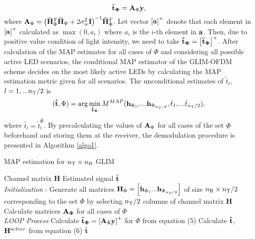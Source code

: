 \documentclass[12pt,letterpaper]{IEEEtran}
\begin{document}
\begin{equation}
{\bf{\bar t}_\Phi} = {{\bf{A}}_\Phi }{\bf{y}},
\label{equa:find t}
\end{equation}
where ${{\bf{A}}_\Phi } = {\left( {{\bf{\bar H}}_\Phi ^T{{{\bf{\bar H}}}_\Phi } + 2\sigma _w^2{\bf{I}}} \right)^{ - 1}}{\bf{\bar H}}_\Phi ^T$. Let vector ${\left[ {\bf{a}} \right]^ + }$ denote that each element in ${\left[ {\bf{a}} \right]^ + }$ calculated as $\max \left( {0,{a_i}} \right)$ where $a_i$ is the $i{\text{-th}}$ element in $\bf{a}$. Then, due to positive value condition of light intensity, we need to take ${{\bf{\tilde t}_\Phi}} = {\left[ {{{{\bf{\bar t}_\Phi}}}} \right]^ + }$. After calculation of the MAP estimates for all cases of $\Phi$ and considering all possible active LED scenarios, the conditional MAP estimator of the GLIM-OFDM scheme decides on the most likely active LEDs by calculating the MAP estimation metric given for all scenarios. The unconditional estimates of ${{\tilde t}_{l}}$, $l = 1,...{n_{\text T}}/2$ is 
\begin{equation}
({\bf{\hat t}},\Phi)  = \arg \mathop {\min }\limits_{{{{\bf{\tilde t}}}_{\bf{\Phi }}}} {M^{MAP}}({{\bf{h}}_{{\Phi _1}}},...{{\bf{h}}_{{\Phi _{{n_{\text{T}}}/2}}}},{\tilde t_1},...{\tilde t_{{n_{\text{T}}}/2}}),
\end{equation}
where ${\hat t_l} = \tilde t_l^{\hat{\Phi}}$. By precalculating the values of ${{\bf{A}}_\Phi}$ for all cases of the set $\Phi$ beforehand and storing them at the receiver, the demodulation procedure is presented in Algorithm \ref{algo1}. 
\begin{algorithm}[H]
	\caption{MAP estimation for $n_{\text T} \times  n_{\text R}$ GLIM}
	\label{algo1}
	\begin{algorithmic}[1]
		\renewcommand{\algorithmicrequire}{\textbf{Input:}}
		\renewcommand{\algorithmicensure}{\textbf{Output:}}
		\REQUIRE Channel matrix {\bfseries{H}}
		\ENSURE  Estimated signal ${\hat{\bf{t}}}$
		\\ \textit{Initialization} :
		\STATE Generate all matrices ${{\bf{H}}_\Phi } = {\left[ {{{\bf{h}}_{{\Phi _1}}}...{{\bf{h}}_{{\Phi _{{n_{\text{T}}}/2}}}}} \right]}$ of size $n_{\text R}\times n_{\text T}/2$ corresponding to the set $\Phi$ by selecting $n_{\text T}/2$ columns of channel matrix {\bfseries{H}}\\
		Calculate matrices ${\bf{A}_\Phi}$ for all cases of $\Phi$
		\\ \textit{LOOP Process}
		\STATE Calculate ${{{\bf{\tilde t}}}_{\bf{\Phi }}} = {\left[ {{{\bf{A}}_\Phi }{\bf{y}}} \right]^ + }$ for $\Phi$ from equation (5)
		\STATE Calculate $\bf{\hat t}$, ${{\bf{H}}^{active}}$ from equation (6)
		\ENDFOR	
		\RETURN ${\hat{\bf{t}}}$ 
	\end{algorithmic} 
\end{algorithm}
\end{document}
